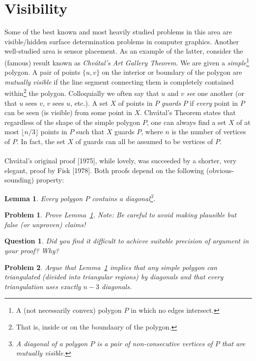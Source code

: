 \documentclass[11pt]{article}
\newtheorem{lemma}{Lemma}
\newtheorem{question}{Question}
\newtheorem{problem}{Problem}
\begin{document}
\section{Visibility}
Some of the best known and most heavily studied problems in this area are visible/hidden surface determination problems in computer graphics.
Another well-studied area is sensor placement. As an example of the latter, consider the (famous) result known as {\em Chv\'atal's Art Gallery Theorem}.
We are given a {\em simple}\footnote{A (not necessarily convex) polygon $P$ in which no edges intersect.} 
polygon. A pair of points $\{u, v\}$ on the interior or boundary of the polygon are {\em mutually visible} if the line segment
connecting them is completely contained within\footnote{That is, inside or on the boundaary of the polygon.} the polygon.
Colloquially we often say that $u$ and $v$ {\em see} one another (or that $u$ sees $v$, $v$ sees $u$, etc.).
A set $X$ of points in $P$ {\em guards} $P$ if {\em every} point in $P$ can be seen (is visible) from some point in $X$.
Chv\'atal's Theorem states that regardless of the shape of the simple polygon $P$, one can always find a set $X$ of at most $\lfloor n/3 \rfloor$ points in $P$ such that $X$ guards $P$, where $n$ is the number of vertices of $P$. In fact,
the set $X$ of guards can all be assumed to be vertices of $P$.
\\
\\
Chv\'atal's original proof [1975], while lovely, was succeeded by a shorter, very elegant, proof by Fisk [1978]. Both proofs
depend on the following (obvious-sounding) property: 

\begin{lemma}\label{lem:diagonal}
Every polygon $P$ contains a {\em diagonal}\footnote{A diagonal
of a polygon $P$ is a pair of non-consecutive vertices of $P$ that are mutually visible.}.
\end{lemma}

\begin{problem}
Prove  Lemma~\ref{lem:diagonal}. Note: Be careful to avoid making plausible but false (or unproven) claims!
\end{problem}

\begin{question}
Did you find it difficult to achieve suitable precision of argument in your proof? Why?
\end{question}

\begin{problem}\label{thm:triangulation}
Argue that Lemma~\ref{lem:diagonal} implies that any simple polygon can triangulated (divided into triangular
regions) by diagonals and that every triangulation uses exactly $n-3$ diagonals.
\end{problem}
\end{document}
